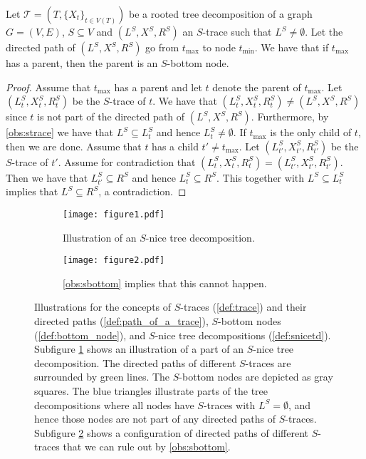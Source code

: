 \documentclass[a4paper,UKenglish,cleveref, autoref, thm-restate, numberwithinsect]{lipics-v2021}
\begin{document}
\begin{observation}\label{obs:sbottom}
    Let $\mathcal{T}=(T,\{X_t\}_{t\in V(T)})$ be a rooted tree decomposition of a graph $G=(V,E)$, $S\subseteq V$ and $(L^S, X^S, R^S)$ an $S$-trace such that $L^S\ne \emptyset$. Let the directed path of $(L^S, X^S, R^S)$ go from $t_{\max}$ to node $t_{\min}$. We have that if $t_{\max}$ has a parent, then the parent is an $S$-bottom node.
\end{observation}
\begin{proof}
    Assume that $t_{\max}$ has a parent and let $t$ denote the parent of $t_{\max}$. Let $(L_t^S, X_t^S, R_t^S)$ be the $S$-trace of $t$. We have that $(L_t^S, X_t^S, R_t^S)\neq (L^S, X^S, R^S)$ since $t$ is not part of the directed path of $(L^S, X^S, R^S)$. Furthermore, by \cref{obs:strace} we have that $L^S\subseteq L_t^S$ and hence $L_t^S\neq\emptyset$. If $t_{\max}$ is the only child of $t$, then we are done. Assume that $t$ has a child $t'\neq t_{\max}$. Let $(L_{t'}^S, X_{t'}^S, R_{t'}^S)$ be the $S$-trace of $t'$. Assume for contradiction that $(L_t^S, X_t^S, R_t^S)= (L_{t'}^S, X_{t'}^S, R_{t'}^S)$. Then we have that $L_{t'}^S\subseteq R^S$ and hence $L_{t}^S\subseteq R^S$. This together with $L^S\subseteq L_t^S$ implies that $L^S\subseteq R^S$, a contradiction.
\end{proof}

\begin{figure}[t]
\centering
\begin{subfigure}[t]{0.49\textwidth}
\centering
\texttt{[image: figure1.pdf]}
\caption{Illustration of an $S$-nice tree decomposition.}\label{fig:tracesa}
\end{subfigure}
\begin{subfigure}[t]{0.49\textwidth}
\centering
\texttt{[image: figure2.pdf]}
\caption{\cref{obs:sbottom} implies that this cannot happen.}\label{fig:tracesb}
\end{subfigure}
\caption{Illustrations for the concepts of $S$-traces (\cref{def:trace}) and their directed paths (\cref{def:path_of_a_trace}), $S$-bottom nodes (\cref{def:bottom_node}), and $S$-nice tree decompositions (\cref{def:snicetd}). Subfigure \ref{fig:tracesa} shows an illustration of a part of an $S$-nice tree decomposition. The directed paths of different $S$-traces are surrounded by green lines. The $S$-bottom nodes are depicted as gray squares. The blue triangles illustrate parts of the tree decompositions where all nodes have $S$-traces with $L^S=\emptyset$, and hence those nodes are not part of any directed paths of $S$-traces. Subfigure \ref{fig:tracesb} shows a configuration of directed paths of different $S$-traces that we can rule out by \cref{obs:sbottom}.}\label{fig:traces}
\end{figure}
\end{document}
